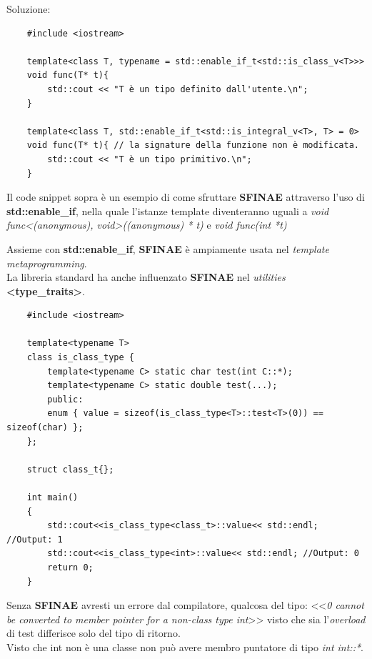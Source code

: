 \textsf{\small Soluzione: } \\

\begin{lstlisting}
	#include <iostream>
	
	template<class T, typename = std::enable_if_t<std::is_class_v<T>>>
	void func(T* t){
		std::cout << "T è un tipo definito dall'utente.\n";
	}
	
	template<class T, std::enable_if_t<std::is_integral_v<T>, T> = 0>
	void func(T* t){ // la signature della funzione non è modificata.
		std::cout << "T è un tipo primitivo.\n";
	}
\end{lstlisting}

\textsf{\small Il code snippet sopra è un esempio di come sfruttare \textbf{SFINAE} attraverso l'uso di \textbf{std::enable\_if}, nella quale l'istanze template diventeranno uguali a \emph{void func<(anonymous), void>((anonymous) * t)} e \emph{void func(int *t)}} \break

\textsf{\small Assieme con \textbf{std::enable\_if}, \textbf{SFINAE} è ampiamente usata nel \emph{template metaprogramming}.} \\

\textsf{\small La libreria standard ha anche influenzato \textbf{SFINAE} nel \emph{utilities} \textbf{<type\_traits>}.} \\

\begin{lstlisting}
	#include <iostream>
	
	template<typename T>
	class is_class_type {
		template<typename C> static char test(int C::*);    
		template<typename C> static double test(...);
		public:
		enum { value = sizeof(is_class_type<T>::test<T>(0)) == sizeof(char) };
	};
	
	struct class_t{};
	
	int main()
	{
		std::cout<<is_class_type<class_t>::value<< std::endl; //Output: 1
		std::cout<<is_class_type<int>::value<< std::endl; //Output: 0
		return 0;
	}
\end{lstlisting}

\textsf{\small Senza \textbf{SFINAE} avresti un errore dal compilatore, qualcosa del tipo: <<\emph{0 cannot be converted to member pointer for a non-class type int}>> visto che sia l'\emph{overload} di test differisce solo del tipo di ritorno.} \\
\textsf{\small Visto che int non è una classe non può avere membro puntatore di tipo \emph{int int::*}.} \\

